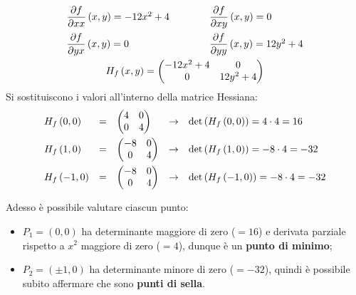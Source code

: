 \documentclass[a4paper]{article}
\makeatletter
\newenvironment{rowequmat}[1]{\left(\array{@{}#1@{}}}{\endarray\right)}
\makeatother
\begin{document}
	\begin{gather*}
		\begin{array}{lcl}
			\dfrac{\partial f}{\partial xx}\left(x,y\right) = -12x^{2} + 4 	&\hspace{2em}& \dfrac{\partial f}{\partial xy}\left(x,y\right) = 0 \\ [1em]
			\dfrac{\partial f}{\partial yx}\left(x,y\right) = 0				&\hspace{2em}& \dfrac{\partial f}{\partial yy}\left(x,y\right) = 12y^{2} + 4
		\end{array}
		\\
		H_{f}\left(x,y\right) = \begin{rowequmat}{cc}
			-12x^{2} + 4 & 0 \\
			0 & 12y^{2} + 4
		\end{rowequmat}
	\end{gather*}
	Si sostituiscono i valori all'interno della matrice Hessiana:
	\begin{equation*}
		\begin{array}{lclcl}
			H_{f}\left(0,0\right) &=& \begin{rowequmat}{cc}
				4 & 0 \\
				0 & 4
			\end{rowequmat} &\rightarrow& \det\left(H_{f}\left(0,0\right)\right) = 4 \cdot 4 = 16 \\ [1em]
			H_{f}\left(1,0\right) &=& \begin{rowequmat}{cc}
				-8 & 0 \\
				0 & 4
			\end{rowequmat} &\rightarrow& \det\left(H_{f}\left(1,0\right)\right) = -8 \cdot 4 = -32 \\ [1em]
			H_{f}\left(-1,0\right) &=& \begin{rowequmat}{cc}
				-8 & 0 \\
				0 & 4
			\end{rowequmat} &\rightarrow& \det\left(H_{f}\left(-1,0\right)\right) = -8 \cdot 4 = -32 \\ [1em]
		\end{array}
	\end{equation*}
	Adesso è possibile valutare ciascun punto:
	\begin{itemize}
		\item $P_{1} = \left(0,0\right)$ ha determinante maggiore di zero ($= 16$) e derivata parziale rispetto a $x^{2}$ maggiore di zero ($= 4$), dunque è un \textbf{punto di minimo};
		
		\item $P_{2} = \left(\pm 1,0\right)$ ha determinante minore di zero ($= -32$), quindi è possibile subito affermare che sono \textbf{punti di sella}.
	\end{itemize}
\end{document}
